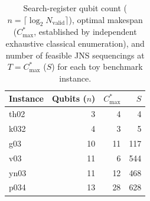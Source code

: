 \begin{table}[!ht]
\centering\small
\begin{tabular}{lrrr}
\toprule
Instance & Qubits ($n$) & $C^*_{\max}$ & $S$ \\
\midrule
th02 &  3 &  4 &   4 \\
k032 &  4 &  3 &   5 \\
g03  & 10 & 11 & 117 \\
v03  & 11 &  6 & 544 \\
yn03 & 11 & 12 & 468 \\
p034 & 13 & 28 & 628 \\
\bottomrule
\end{tabular}
\caption{Search-register qubit count
($n=\lceil\log_2 N_{\mathrm{valid}}\rceil$), optimal makespan
($C^*_{\max}$, established by independent exhaustive classical enumeration),
and number of feasible JNS sequencings at $T=C^*_{\max}$ ($S$)
for each toy benchmark instance.}
\label{tab:instance-summary}
\end{table}
